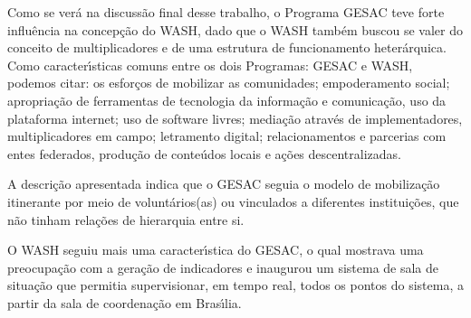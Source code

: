 \documentclass[
12pt,		%
openright,	%
twoside,  %
a4paper,			%
chapter=TITLE,		%
english,			%
french,				%
spanish,			%
brazil				%
]{USPSC-classe/USPSC}
\begin{document}
Como se ver\'a na discuss\~ao final desse trabalho, o Programa GESAC teve forte influ\^encia na concep\c{c}\~ao do WASH, dado que o WASH tamb\'em buscou se valer do conceito de multiplicadores e de uma estrutura de funcionamento heter\'arquica. Como caracter\'{\i}sticas comuns entre os dois Programas: GESAC e WASH, podemos citar:  os esfor\c{c}os de mobilizar as comunidades; empoderamento social; apropria\c{c}\~ao de ferramentas de tecnologia da informa\c{c}\~ao e comunica\c{c}\~ao, uso da plataforma internet; uso de software livres; media\c{c}\~ao atrav\'es de implementadores, multiplicadores em campo; letramento digital; relacionamentos e parcerias com entes federados, produ\c{c}\~ao de conte\'udos locais e a\c{c}\~oes descentralizadas.

















A descri\c{c}\~ao apresentada indica que o GESAC seguia o modelo de mobiliza\c{c}\~ao itinerante por meio de volunt\'arios(as) ou vinculados a diferentes institui\c{c}\~oes, que n\~ao tinham rela\c{c}\~oes de hierarquia entre si.

















O WASH seguiu mais uma caracter\'{\i}stica do GESAC, o qual  mostrava uma preocupa\c{c}\~ao com a gera\c{c}\~ao de indicadores e inaugurou um sistema de \textquotedbl  sala de situa\c{c}\~ao \textquotedbl  que permitia supervisionar, em tempo real, todos os pontos do sistema, a partir da sala de coordena\c{c}\~ao em Bras\'{\i}lia.


















\noindent\begin{center}\mbox{\centering{}}\end{center}
\end{document}

